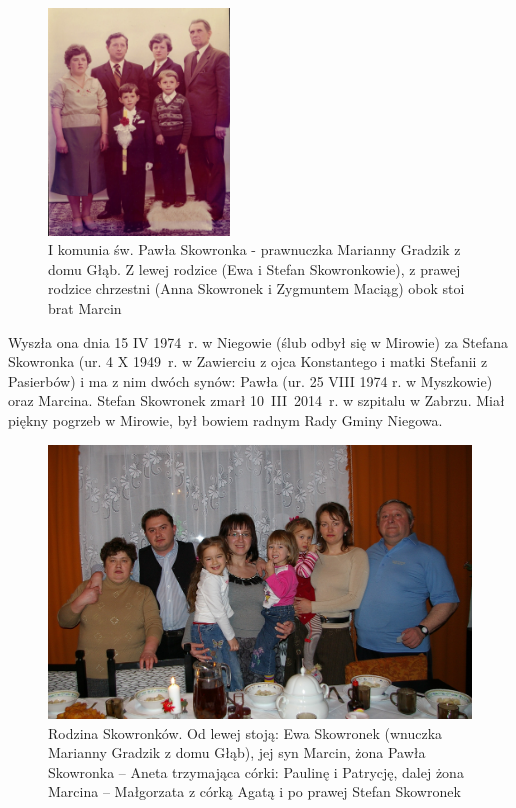 \begin{figure}[!hb]
\begin{center}
\includegraphics[width=0.43\textwidth]{zdjecia/pawel_skowronek_1_komunia.jpg}
\caption[I komunia św. Pawła Skowronka]{I komunia św. Pawła Skowronka - prawnuczka Marianny Gradzik z domu Głąb. Z lewej rodzice (Ewa i Stefan Skowronkowie), z prawej rodzice chrzestni (Anna Skowronek i Zygmuntem Maciąg) obok stoi brat Marcin}
\label{rys:pawel_skowronek_1_komunia}
\end{center}
\end{figure}

Wyszła ona dnia 15 IV 1974~r. w Niegowie (ślub odbył się w Mirowie) za Stefana Skowronka (ur. 4 X 1949~r. w Zawierciu z ojca Konstantego i matki Stefanii z Pasierbów) i ma z nim dwóch synów: Pawła (ur. 25 VIII 1974 r. w Myszkowie) oraz Marcina. Stefan Skowronek zmarł 10~III~2014~r. w szpitalu w Zabrzu. Miał piękny pogrzeb w Mirowie, był bowiem radnym Rady Gminy Niegowa.

\begin{figure}[!t]
\begin{center}
\includegraphics[width=\textwidth]{zdjecia/rodzina_skowronkow_1.jpg}
\caption[Rodzina Skowronków]{Rodzina Skowronków. Od lewej stoją: Ewa Skowronek (wnuczka Marianny Gradzik z domu Głąb), jej syn Marcin, żona Pawła Skowronka -- Aneta trzymająca córki: Paulinę i Patrycję, dalej żona Marcina -- Małgorzata z córką Agatą i po prawej Stefan Skowronek}
\label{rys:rodzina_skowronkow_1}
\end{center}
\end{figure}

